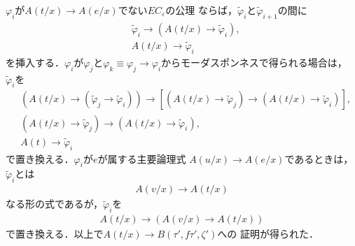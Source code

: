 \begin{description}
			$\varphi_{i}$が$A(t/x) \rightarrow A(e/x)$でない$EC_{\varepsilon}$の公理
			ならば，$\tilde{\varphi}_{i}$と$\tilde{\varphi}_{i+1}$の間に
			\begin{align}
				&\tilde{\varphi}_{i} \rightarrow 
				\left( A(t/x) \rightarrow \tilde{\varphi}_{i} \right), \\
				&A(t/x) \rightarrow \tilde{\varphi}_{i}
			\end{align}
			を挿入する．$\varphi_{i}$が$\varphi_{j}$と$\varphi_{k}
			\equiv \varphi_{j} \rightarrow \varphi_{i}$からモーダスポンネスで得られる場合は，
			$\tilde{\varphi}_{i}$を
			\begin{align}
				&\left( A(t/x) \rightarrow \left(\tilde{\varphi}_{j} \rightarrow
				\tilde{\varphi}_{i} \right) \right)
				\rightarrow \left[ \left( A(t/x) \rightarrow \tilde{\varphi}_{j} \right)
				\rightarrow \left( A(t/x) \rightarrow \tilde{\varphi}_{i} \right) \right], \\
				&\left( A(t/x) \rightarrow \tilde{\varphi}_{j} \right)
				\rightarrow \left( A(t/x) \rightarrow \tilde{\varphi}_{i} \right), \\
				&A(t) \rightarrow \tilde{\varphi}_{i}
			\end{align}
			で置き換える．$\varphi_{i}$が$e$が属する主要論理式
			$A(u/x) \rightarrow A(e/x)$であるときは，$\tilde{\varphi}_{i}$とは
			\begin{align}
				A(v/x) \rightarrow A(t/x)
			\end{align}
			なる形の式であるが，$\tilde{\varphi}_{i}$を
			\begin{align}
				A(t/x) \rightarrow (A(v/x) \rightarrow A(t/x))
			\end{align}
			で置き換える．以上で$A(t/x) \rightarrow B(\tau',f\tau',\zeta')$への
			証明が得られた．
	

\end{description}
